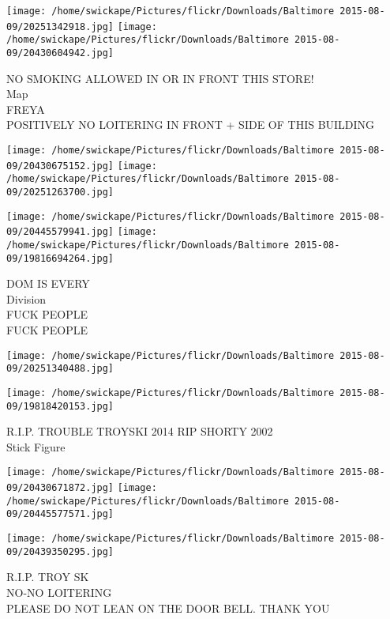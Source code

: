 \documentclass[10pt,letterpaper]{article}
\begin{document}
\texttt{[image: /home/swickape/Pictures/flickr/Downloads/Baltimore 2015-08-09/20251342918.jpg]}
\texttt{[image: /home/swickape/Pictures/flickr/Downloads/Baltimore 2015-08-09/20430604942.jpg]}

NO SMOKING ALLOWED IN OR IN FRONT THIS STORE!\\
Map\\
FREYA\\
POSITIVELY NO LOITERING IN FRONT + SIDE OF THIS BUILDING\\
\pagebreak

\texttt{[image: /home/swickape/Pictures/flickr/Downloads/Baltimore 2015-08-09/20430675152.jpg]}
\texttt{[image: /home/swickape/Pictures/flickr/Downloads/Baltimore 2015-08-09/20251263700.jpg]}

\texttt{[image: /home/swickape/Pictures/flickr/Downloads/Baltimore 2015-08-09/20445579941.jpg]}
\texttt{[image: /home/swickape/Pictures/flickr/Downloads/Baltimore 2015-08-09/19816694264.jpg]}

DOM IS EVERY\\
Division\\
FUCK PEOPLE\\
FUCK PEOPLE\\
\pagebreak

\texttt{[image: /home/swickape/Pictures/flickr/Downloads/Baltimore 2015-08-09/20251340488.jpg]}

\vspace{0.25in}
\texttt{[image: /home/swickape/Pictures/flickr/Downloads/Baltimore 2015-08-09/19818420153.jpg]}

R.I.P. TROUBLE TROYSKI 2014 RIP SHORTY 2002\\
Stick Figure\\
\pagebreak

\texttt{[image: /home/swickape/Pictures/flickr/Downloads/Baltimore 2015-08-09/20430671872.jpg]}
\texttt{[image: /home/swickape/Pictures/flickr/Downloads/Baltimore 2015-08-09/20445577571.jpg]}

\texttt{[image: /home/swickape/Pictures/flickr/Downloads/Baltimore 2015-08-09/20439350295.jpg]}

R.I.P. TROY SK\\
NO{-}NO LOITERING\\
PLEASE DO NOT LEAN ON THE DOOR BELL.  THANK YOU\\
\pagebreak
\end{document}
